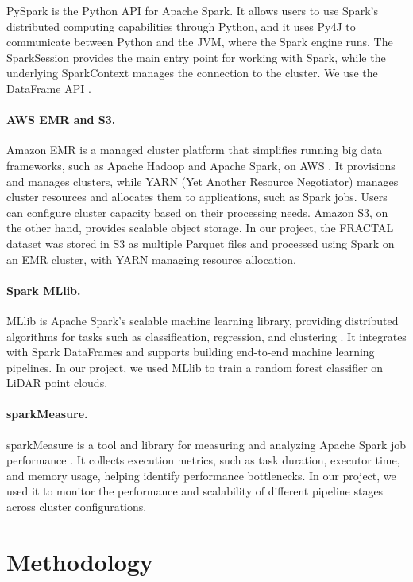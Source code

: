 \documentclass[a4paper, 11pt]{article} %
\begin{document}
PySpark is the Python API for Apache Spark. It allows users to use Spark's distributed computing capabilities through Python, and it uses Py4J to communicate between Python and the JVM, where the Spark engine runs. The SparkSession provides the main entry point for working with Spark, while the underlying SparkContext manages the connection to the cluster. We use the DataFrame API \cite{armbrust2015sparksql}.

\paragraph{AWS EMR and S3.}
Amazon EMR is a managed cluster platform that simplifies running big data frameworks, such as Apache Hadoop and Apache Spark, on AWS \cite{aws2024emr}. It provisions and manages clusters, while YARN (Yet Another Resource Negotiator) \cite{vavilapalli2013yarn} manages cluster resources and allocates them to applications, such as Spark jobs. Users can configure cluster capacity based on their processing needs.
Amazon S3, on the other hand, provides scalable object storage. In our project, the FRACTAL dataset was stored in S3 as multiple Parquet files and processed using Spark on an EMR cluster, with YARN managing resource allocation.

\paragraph{Spark MLlib.}
MLlib is Apache Spark's scalable machine learning library, providing distributed algorithms for tasks such as classification, regression, and clustering \cite{meng2016mllib}. It integrates with Spark DataFrames and supports building end-to-end machine learning pipelines. In our project, we used MLlib to train a random forest classifier \cite{breiman2001random} on LiDAR point clouds.

\paragraph{sparkMeasure.}
sparkMeasure is a tool and library for measuring and analyzing Apache Spark job performance \cite{canalisparkmeasure}. It collects execution metrics, such as task duration, executor time, and memory usage, helping identify performance bottlenecks. In our project, we used it to monitor the performance and scalability of different pipeline stages across cluster configurations.

\section{Methodology}
\label{sec:pipeline}
\end{document}
